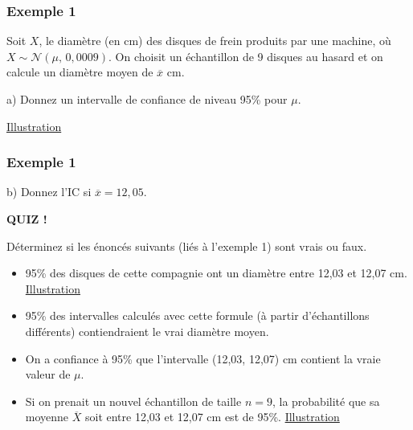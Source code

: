 \documentclass{BeamerTemplate}
\begin{document}
\begin{frame}[t] \frametitle{Exemple 1 }

 {\small
 Soit $X$, le diamètre (en cm)  des disques de frein  produits par une machine, o\`u $X\sim \mathcal{N}(\mu,\, 0,0009)$.  On choisit un échantillon de 9 disques  au hasard et on calcule un diamètre moyen de $\overline{x}$ cm.

 \vspace{3mm}

 \alert{a)} Donnez un intervalle de confiance de niveau 95\% pour $\mu$. 
 }
 
 \vspace{4.5cm}
\href{https://jmiron-icvarconnue.share.connect.posit.cloud/}{Illustration}
 
\end{frame}


\begin{frame}[t] \frametitle{Exemple 1 }

 {\small


 \alert{b)} Donnez l'IC si $\overline{x}=12,05$. 
 }
\end{frame}


\begin{frame}[t]{ }

\centerline{\LARGE\bf \alert{QUIZ !}}
\medskip
Déterminez si les énoncés suivants (liés à l'exemple 1) sont vrais ou faux.

\begin{itemize} \itemsep7mm
\item 95\% des disques de cette compagnie ont un diamètre entre 12,03 et 12,07 cm. \href{https://jmiron-vfvarconnue.share.connect.posit.cloud/}{Illustration}
\item 95\% des intervalles calculés avec cette formule (à partir d'échantillons différents) contiendraient le vrai diamètre moyen.
\item On a confiance à 95\% que l'intervalle (12,03, 12,07) cm contient la vraie valeur de $\mu$.
\item Si on prenait un nouvel échantillon de taille $n=9$, la probabilité que sa moyenne $\overline X$ soit entre 12,03 et 12,07 cm est de 95\%. \href{https://jmiron-vfvarconnue.share.connect.posit.cloud/}{Illustration}
\end{itemize}

\end{frame}

\end{document}
